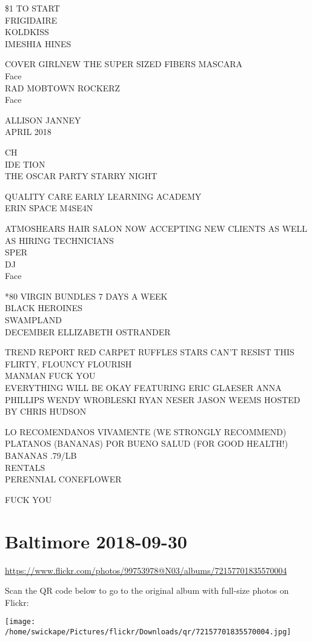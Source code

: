 \documentclass[10pt,letterpaper]{article}
\begin{document}
\$1 TO START\\
FRIGIDAIRE\\
KOLDKISS\\
IMESHIA HINES

COVER GIRLNEW THE SUPER SIZED FIBERS MASCARA\\
Face\\
RAD MOBTOWN ROCKERZ\\
Face

ALLISON JANNEY\\
APRIL 2018

CH\\
IDE TION\\
THE OSCAR PARTY STARRY NIGHT

QUALITY CARE EARLY LEARNING ACADEMY\\
ERIN SPACE M4SE4N

ATMOSHEARS HAIR SALON NOW ACCEPTING NEW CLIENTS AS WELL AS HIRING TECHNICIANS\\
SPER\\
DJ\\
Face

*80 VIRGIN BUNDLES 7 DAYS A WEEK\\
BLACK HEROINES\\
SWAMPLAND\\
DECEMBER ELLIZABETH OSTRANDER

TREND REPORT RED CARPET RUFFLES STARS CAN'T RESIST THIS FLIRTY, FLOUNCY FLOURISH\\
MANMAN FUCK YOU\\
EVERYTHING WILL BE OKAY FEATURING ERIC GLAESER ANNA PHILLIPS WENDY WROBLESKI RYAN NESER JASON WEEMS HOSTED BY CHRIS HUDSON

LO RECOMENDANOS VIVAMENTE (WE STRONGLY RECOMMEND) PLATANOS (BANANAS) POR BUENO SALUD (FOR GOOD HEALTH!) BANANAS .79/LB\\
RENTALS\\
PERENNIAL CONEFLOWER

FUCK YOU
\pagebreak

\section*{Baltimore 2018-09-30}

\url{https://www.flickr.com/photos/99753978@N03/albums/72157701835570004}

Scan the QR code below to go to the original album with full-size photos on Flickr:

\texttt{[image: /home/swickape/Pictures/flickr/Downloads/qr/72157701835570004.jpg]}
\pagebreak
\end{document}
